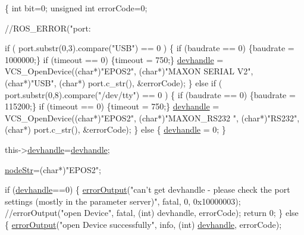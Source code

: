 \begin{DoxyCode}
\{
    \textcolor{keywordtype}{int} bit=0;
    \textcolor{keywordtype}{unsigned} \textcolor{keywordtype}{int} errorCode=0;

    \textcolor{comment}{//ROS\_ERROR("port: %

    \textcolor{keywordflow}{if} ( port.substr(0,3).compare(\textcolor{stringliteral}{"USB"}) == 0 ) \{
        \textcolor{keywordflow}{if} (baudrate == 0) \{baudrate = 1000000;\}
        \textcolor{keywordflow}{if} (timeout == 0) \{timeout = 750;\}
        \hyperlink{classEpos2MotorController_a40594faab444bcba221ab9d55d1162cd}{devhandle} = VCS\_OpenDevice((\textcolor{keywordtype}{char}*)\textcolor{stringliteral}{"EPOS2"}, (\textcolor{keywordtype}{char}*)\textcolor{stringliteral}{"MAXON
       SERIAL V2"}, (\textcolor{keywordtype}{char}*)\textcolor{stringliteral}{"USB"}, (\textcolor{keywordtype}{char}*) port.c\_str(), &errorCode);
    \} \textcolor{keywordflow}{else} \textcolor{keywordflow}{if} ( port.substr(0,8).compare(\textcolor{stringliteral}{"/dev/tty"}) == 0 ) \{
        \textcolor{keywordflow}{if} (baudrate == 0) \{baudrate = 115200;\}
        \textcolor{keywordflow}{if} (timeout == 0) \{timeout = 750;\}
        \hyperlink{classEpos2MotorController_a40594faab444bcba221ab9d55d1162cd}{devhandle} = VCS\_OpenDevice((\textcolor{keywordtype}{char}*)\textcolor{stringliteral}{"EPOS2"}, (\textcolor{keywordtype}{char}*)\textcolor{stringliteral}{"MAXON\_RS232
      "}, (\textcolor{keywordtype}{char}*)\textcolor{stringliteral}{"RS232"}, (\textcolor{keywordtype}{char}*) port.c\_str(), &errorCode);
    \} \textcolor{keywordflow}{else} \{
        \hyperlink{classEpos2MotorController_a40594faab444bcba221ab9d55d1162cd}{devhandle} = 0;
    \}

    this->\hyperlink{classEpos2MotorController_a40594faab444bcba221ab9d55d1162cd}{devhandle}=\hyperlink{classEpos2MotorController_a40594faab444bcba221ab9d55d1162cd}{devhandle};

    \hyperlink{classEpos2MotorController_aec7abbd4cd8e70e98f28cae457275e31}{nodeStr}=(\textcolor{keywordtype}{char}*)\textcolor{stringliteral}{"EPOS2"};

    \textcolor{keywordflow}{if} (\hyperlink{classEpos2MotorController_a40594faab444bcba221ab9d55d1162cd}{devhandle}==0) \{
        \hyperlink{classEpos2MotorController_a64d5e3e3858597c111e60ba8b382a63b}{errorOutput}(\textcolor{stringliteral}{"can't get devhandle - please check the port
       settings (mostly in the parameter server)"}, fatal, 0, 0x10000003);
        \textcolor{comment}{//errorOutput("open Device", fatal, (int) devhandle, errorCode);}
        \textcolor{keywordflow}{return} 0;
    \} \textcolor{keywordflow}{else} \{
        \hyperlink{classEpos2MotorController_a64d5e3e3858597c111e60ba8b382a63b}{errorOutput}(\textcolor{stringliteral}{"open Device successfully"}, info, (\textcolor{keywordtype}{int}) \hyperlink{classEpos2MotorController_a40594faab444bcba221ab9d55d1162cd}{
      devhandle}, errorCode);

}
\end{DoxyCode}
